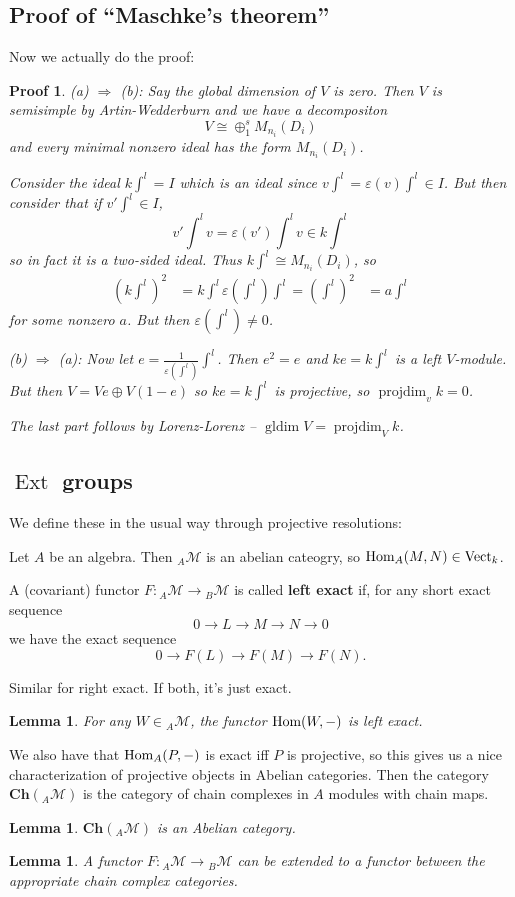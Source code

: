 \documentclass[12pt]{article}
\theoremstyle{break}
\theoremstyle{nonumberbreak}
\theoremstyle{changebreak}
\newtheorem{lem}[thm]{Lemma}
\theoremstyle{break}
\theoremstyle{nonumberbreak}
\newtheorem{prf}{Proof}
\theoremstyle{nonumberplain}
\theoremstyle{change}
\DeclareMathOperator{\Ext}{Ext}
\DeclareMathOperator{\gldim}{gldim}
\DeclareMathOperator{\projdim}{projdim}
\newcommand*{\Hom}{\ensuremath\text{Hom}}
\newcommand*{\Vectk}{\operatorname{Vect}_k}
\newcommand*{\calM}{\mathcal{M}}
\newcommand*{\Ch}{\mathbf{Ch}}
\begin{document}
\subsection{Proof of ``Maschke's theorem''}
Now we actually do the proof:
\begin{prf}
	(a) $\Rightarrow$ (b): Say the global dimension of $V$ is zero. Then $V$ is semisimple by Artin-Wedderburn and we have a decompositon
	\[V\cong \oplus_1^s M_{n_i}(D_i)\]
	and every minimal nonzero ideal has the form $M_{n_i}(D_i)$.

	Consider the ideal $k\int^l=I$ which is an ideal since $v\int^l=\varepsilon(v)\int^l\in I$. But then consider that if $v'\int^l\in I$, 
	\[v'\int^l v=\varepsilon(v')\int^l v\in k\int^l\]
	so in fact it is a two-sided ideal. Thus $k\int^l\cong M_{n_i}(D_i)$, so 
	\begin{align*}
		(k\int^l)^2&=k\int^l
		\varepsilon(\int^l)\int^l=(\int^l)^2&=a\int^l
	\end{align*}
	for some nonzero $a$. But then $\varepsilon(\int^l)\ne 0$.

	(b) $\Rightarrow$ (a): Now let $e=\frac{1}{\varepsilon(\int^l)}\int^l$. Then $e^2=e$ and $ke=k\int^l$ is a left $V$-module.
	But then $V=Ve\oplus V(1-e)$ so $ke=k\int^l$ is projective, so $\projdim_v k=0$.

	The last part follows by Lorenz-Lorenz -- $\gldim V=\projdim_V k$.
\end{prf}

\subsection{$\Ext$ groups}
We define these in the usual way through projective resolutions:

Let $A$ be an algebra. Then $_A\calM$ is an abelian cateogry, so $\Hom_A(M,N)\in\Vectk$.
\begin{defn}
	A (covariant) functor $F:{_A\calM}\to{_B\calM}$ is called \textbf{left exact} if, for any short exact sequence
	\[0\to L\to M\to N\to 0\]
	we have the exact sequence
	\[0\to F(L)\to F(M)\to F(N).\]

	Similar for right exact. If both, it's just exact.
\end{defn}
\begin{lem}
	For any $W\in{_A\calM}$, the functor $\Hom(W,-)$ is left exact.
\end{lem}
We also have that $\Hom_A(P,-)$ is exact iff $P$ is projective, so this gives us a nice characterization of projective objects in Abelian categories.
Then the category $\Ch({_A\calM})$ is the category of chain complexes in $A$ modules with chain maps.
\begin{lem}
	$\Ch({_A\calM})$ is an Abelian category.
\end{lem}
\begin{lem}
	A functor $F:{_A\calM}\to{_B\calM}$ can be extended to a functor between the appropriate chain complex categories.
\end{lem}
\end{document}
